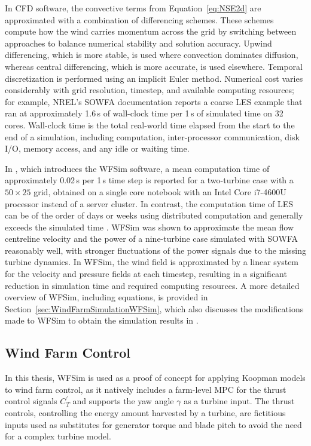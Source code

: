 In CFD software, the convective terms from Equation~\eqref{eq:NSE2d} are approximated with a combination of differencing schemes. These schemes compute how the wind carries momentum across the grid by switching between approaches to balance numerical stability and solution accuracy. Upwind differencing, which is more stable, is used where convection dominates diffusion, whereas central differencing, which is more accurate, is used elsewhere. Temporal discretization is performed using an implicit Euler method.
%
Numerical cost varies considerably with grid resolution, timestep, and available computing resources; for example, NREL's SOWFA documentation \cite{churchfield2012overview} reports a coarse LES example that ran at approximately 1.6\,s of wall-clock time per 1\,s of simulated time on 32 cores. Wall-clock time is the total real-world time elapsed from the start to the end of a simulation, including computation, inter-processor communication, disk I/O, memory access, and any idle or waiting time.

In \cite{boersma2018control}, which introduces the WFSim software, a mean computation time of approximately 0.02\,s per 1\,s time step is reported for a two-turbine case with a $50 \times 25$ grid, obtained on a single core notebook with an Intel Core i7-4600U processor instead of a server cluster. In contrast, the computation time of LES can be of the order of days or weeks using distributed computation and generally exceeds the simulated time \cite{boersma2018control}. WFSim was shown to approximate the mean flow centreline velocity and the power of a nine-turbine case simulated with SOWFA reasonably well, with stronger fluctuations of the power signals due to the missing turbine dynamics.
%
In WFSim, the wind field is approximated by a linear system for the velocity and pressure fields at each timestep, resulting in a significant reduction in simulation time and required computing resources. A more detailed overview of WFSim, including equations, is provided in Section~\ref{sec:WindFarmSimulationWFSim}, which also discusses the modifications made to WFSim to obtain the simulation results in \cite{dittmer2022data,dittmer2023koopman}.

\subsection{Wind Farm Control}\label{Subsection:Windfarmcontrol}
In this thesis, WFSim is used as a proof of concept for applying Koopman models to wind farm control, as it natively includes a farm-level MPC for the thrust control signals $C_T^{\prime}$ and supports the yaw angle $\gamma$ as a turbine input. The thrust controls, controlling the energy amount harvested by a turbine, are fictitious inputs used as substitutes for generator torque and blade pitch to avoid the need for a complex turbine model.

